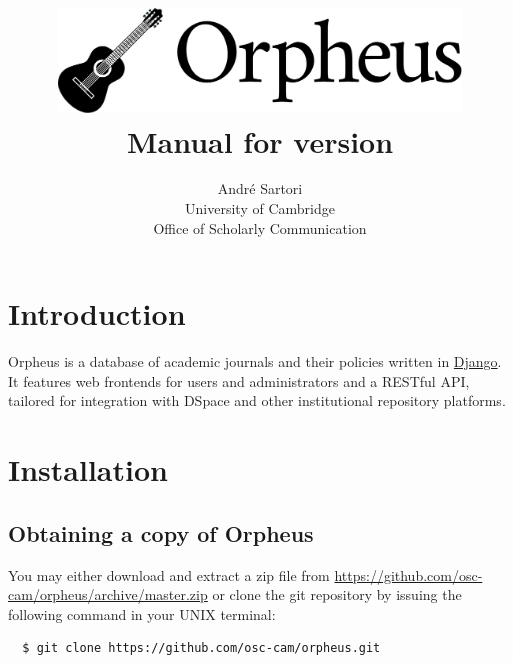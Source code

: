 \documentclass[british, 12pt]{article}
\begin{document}
\title{\includegraphics[width=0.8\textwidth]{orpheus-logo-final}\\
  \large Manual for version \orpheusversion\\[1mm]
}
\author{André Sartori\\
  \normalsize University of Cambridge\\[-1mm]
  \normalsize Office of Scholarly Communication}
\maketitle

\tableofcontents{}

\section{Introduction}

Orpheus is a database of academic journals and their policies written in \href{https://www.djangoproject.com}{Django}. It features web frontends for users and administrators and a RESTful API, tailored for integration with DSpace and other institutional repository platforms.

\section{Installation}

\lstset{language=bash}

\subsection{Obtaining a copy of Orpheus}

You may either download and extract a zip file from \url{https://github.com/osc-cam/orpheus/archive/master.zip} or clone the git repository by issuing the following command in your UNIX terminal:

\begin{lstlisting}
  $ git clone https://github.com/osc-cam/orpheus.git
\end{lstlisting}
\end{document}
